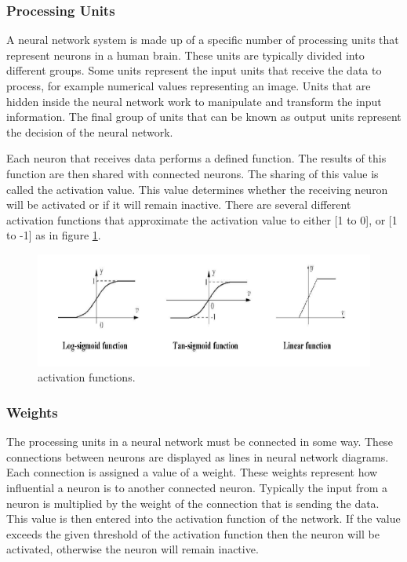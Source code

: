 \documentclass[12pt, a4paper, twoside]{report}
\begin{document}
\subsubsection{Processing Units}
A neural network system is made up of a specific number of processing units that represent neurons in a human brain. These units are typically divided into different groups. Some units represent the input units that receive the data to process, for example numerical values representing an image. Units that are hidden inside the neural network work to manipulate and transform the input information. The final group of units that can be known as output units represent the decision of the neural network.
\par
Each neuron that receives data performs a defined function. The results of this function are then shared with connected neurons. The sharing of this value is called the activation value. This value determines whether the receiving neuron will be activated or if it will remain inactive. There are several different activation functions that approximate the activation value to either [1 to 0], or [1 to -1] as in figure \ref{fig:activation_functions}.

\begin{figure}[ht]
	\centering
	\includegraphics[width=1\textwidth]
	{images/chapter4/activation_functions}
	\caption{activation functions.}
	\label{fig:activation_functions}
\end{figure}

\subsubsection{Weights}
The processing units in a neural network must be connected in some way. These connections between neurons are displayed as lines in neural network diagrams. Each connection is assigned a value of a weight. These weights represent how influential a neuron is to another connected neuron. Typically the input from a neuron is multiplied by the weight of the connection that is sending the data. This value is then entered into the activation function of the network. If the value exceeds the given threshold of the activation function then the neuron will be activated, otherwise the neuron will remain inactive.
\end{document}
